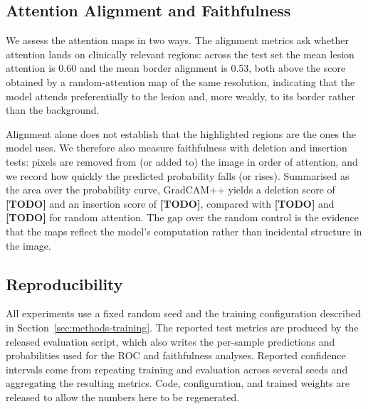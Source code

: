 \subsection{Attention Alignment and Faithfulness}

We assess the attention maps in two ways. The alignment metrics ask whether
attention lands on clinically relevant regions: across the test set the mean
lesion attention is 0.60 and the mean border alignment is 0.53, both above the score
obtained by a random-attention map of the same resolution, indicating that the
model attends preferentially to the lesion and, more weakly, to its border
rather than the background.

Alignment alone does not establish that the highlighted regions are the ones the
model uses. We therefore also measure faithfulness with deletion and insertion
tests: pixels are removed from (or added to) the image in order of attention, and
we record how quickly the predicted probability falls (or rises). Summarised as
the area over the probability curve, GradCAM++ yields a deletion score of
\textbf{[TODO]} and an insertion score of \textbf{[TODO]}, compared with
\textbf{[TODO]} and \textbf{[TODO]} for random attention.%
The gap over the random control is the evidence that the maps reflect the
model's computation rather than incidental structure in the image.

\subsection{Reproducibility}
\label{sec:reproducibility}

All experiments use a fixed random seed and the training configuration described
in Section~\ref{sec:methods-training}. The reported test metrics are produced by
the released evaluation script, which also writes the per-sample predictions and
probabilities used for the ROC and faithfulness analyses. Reported confidence
intervals come from repeating training and evaluation across several seeds and
aggregating the resulting metrics. Code, configuration, and trained weights are
released to allow the numbers here to be regenerated.
